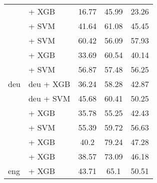 \begin{longtable}{llccc}
    \midrule
    \multirow{11}{*}{deu}              & \citep{all-MiniLM-L12-v2}  + XGB                                   & 16.77                                & 45.99              & 23.26             \\
                                       & \citep{heinz2023e5basestsende} + SVM                               & 41.64                                & 61.08              & 45.45             \\
                                       & \citep{wang2024multilingual} + SVM                                 & 60.42                                & 56.09              & 57.93             \\
                                       & \citep{chan2020germanslanguagemodel} + XGB                         & 33.69                                & 60.54              & 40.14             \\
                                       & \citep{chibb2023germansemanticsts} + SVM                           & 56.87                                & 57.48              & 56.25             \\
                                       & \citep{mohr2024multi} deu + XGB                                    & 36.24                                & 58.28              & 42.87             \\
                                       & \citep{mohr2024multi} deu + SVM                                    & 45.68                                & 60.41              & 50.25             \\
                                       & \citep{sturua2024jinaembeddingsv3multilingualembeddingstask} + XGB & 35.78                                & 55.25              & 42.43             \\
                                       & \citep{sturua2024jinaembeddingsv3multilingualembeddingstask} + SVM & 55.39                                & 59.72              & 56.63             \\
                                       & \citep{ni2021sentencet5scalablesentenceencoders} + XGB             & 40.2                                 & 79.24              & 47.28             \\
                                       & \citep{wang2023improving} + XGB                                    & 38.57                                & 73.09              & 46.18             \\
    \midrule
    \multirow{16}{*}{eng}              & \citep{all-MiniLM-L12-v2}  + XGB                                   & 43.71                                & 65.1               & 50.51             \\

\end{longtable}
